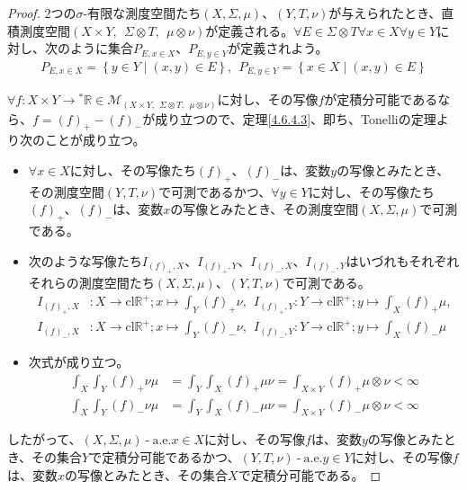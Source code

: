 \documentclass[dvipdfmx]{jsarticle}
\begin{document}
\begin{proof}
2つの$\sigma$-有限な測度空間たち$(X,\varSigma,\mu)$、$(Y,T,\nu)$が与えられたとき、直積測度空間$(X \times Y,\ \ \varSigma \otimes T,\ \ \mu \otimes \nu)$が定義される。$\forall E \in \varSigma \otimes T\forall x \in X\forall y \in Y$に対し、次のように集合$P_{E,x \in X}$、$P_{E,y \in Y}$が定義されよう。
\begin{align*}
P_{E,x \in X} = \left\{ y \in Y \middle| (x,y) \in E \right\},\ \ P_{E,y \in Y} = \left\{ x \in X \middle| (x,y) \in E \right\}
\end{align*}\par
$\forall f:X \times Y \rightarrow{}^{*}\mathbb{R} \in \mathcal{M}_{(X \times Y,\ \ \varSigma \otimes T,\ \ \mu \otimes \nu)}$に対し、その写像$f$が定積分可能であるなら、$f = (f)_{+} - (f)_{-}$が成り立つので、定理\ref{4.6.4.3}、即ち、Tonelliの定理より次のことが成り立つ。
\begin{itemize}
\item
  $\forall x \in X$に対し、その写像たち$(f)_{+}$、$(f)_{-}$は、変数$y$の写像とみたとき、その測度空間$(Y,T,\nu)$で可測であるかつ、$\forall y \in Y$に対し、その写像たち$(f)_{+}$、$(f)_{-}$は、変数$x$の写像とみたとき、その測度空間$(X,\varSigma,\mu)$で可測である。
\item
  次のような写像たち$I_{(f)_{+},X}$、$I_{(f)_{+},Y}$、$I_{(f)_{-},X}$、$I_{(f)_{-},Y}$はいづれもそれぞれそれらの測度空間たち$(X,\varSigma,\mu)$、$(Y,T,\nu)$で可測である。
\begin{align*}
I_{(f)_{+},X}&:X \rightarrow \mathrm{cl}\mathbb{R}^{+};x \mapsto \int_{Y} {(f)_{+}\nu},\ \ I_{(f)_{+},Y}:Y \rightarrow \mathrm{cl}\mathbb{R}^{+};y \mapsto \int_{X} {(f)_{+}\mu},\\
I_{(f)_{-},X}&:X \rightarrow \mathrm{cl}\mathbb{R}^{+};x \mapsto \int_{Y} {(f)_{-}\nu},\ \ I_{(f)_{-},Y}:Y \rightarrow \mathrm{cl}\mathbb{R}^{+};y \mapsto \int_{X} {(f)_{-}\mu}
\end{align*}
\item
  次式が成り立つ。
\begin{align*}
\int_{X} {\int_{Y} {(f)_{+}\nu}\mu} &= \int_{Y} {\int_{X} {(f)_{+}\mu}\nu} = \int_{X \times Y} {(f)_{+}\mu \otimes \nu} < \infty\\
\int_{X} {\int_{Y} {(f)_{-}\nu}\mu} &= \int_{Y} {\int_{X} {(f)_{-}\mu}\nu} = \int_{X \times Y} {(f)_{-}\mu \otimes \nu} < \infty
\end{align*}
\end{itemize}
したがって、$(X,\varSigma,\mu) \ \text{-} \ \mathrm{a.e.}x \in X$に対し、その写像$f$は、変数$y$の写像とみたとき、その集合$Y$で定積分可能であるかつ、$(Y,T,\nu) \ \text{-} \ \mathrm{a.e.}y \in Y$に対し、その写像$f$は、変数$x$の写像とみたとき、その集合$X$で定積分可能である。\par

\end{proof}
\end{document}
